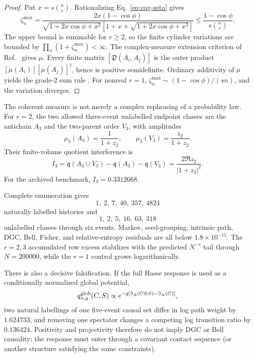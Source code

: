 \begin{proof}
Put \(x=s\binom nr\).  Rationalizing Eq.~\eqref{eq:cqg-zeta} gives
\[
 \zeta_n^{\max}
 =\frac{2x(1-\cos\phi)}
 {\sqrt{1+2x\cos\phi+x^2}
 [1+x+\sqrt{1+2x\cos\phi+x^2}]}
 \leq\frac{1-\cos\phi}{s\binom nr}.
 \]
The upper bound is summable for \(r\geq2\), so the finite cylinder
variations are bounded by
\(\prod_n(1+\zeta_n^{\max})<\infty\).  The complex-measure extension
criterion of Ref.~\cite{SuryaZalel2020} gives \(\mu\).  Every finite matrix
\([\mathfrak D(A_i,A_j)]\) is the outer product
\([\mu(A_i)][\mu(A_j)]^\dagger\), hence is positive semidefinite.  Ordinary
additivity of \(\mu\) yields the grade-2 sum rule
\cite{Sorkin1994QuantumMeasure}.  For nonreal \(r=1\),
\(\zeta_n^{\max}\sim(1-\cos\phi)/(sn)\), and the variation diverges.
\end{proof}

The coherent measure is not merely a complex rephrasing of a probability
law.  For \(r=2\), the two allowed three-event unlabelled endpoint classes
are the antichain \(A_3\) and the two-parent order \(V_3\), with amplitudes
\[
 \mu_3(A_3)=\frac1{1+z_2},\qquad
 \mu_3(V_3)=\frac{z_2}{1+z_2}.
 \]
Their finite-volume quotient interference is
\begin{equation}
 I_3=
 \mathfrak q(A_3\cup V_3)-\mathfrak q(A_3)-\mathfrak q(V_3)
 =\frac{2\Re z_2}{|1+z_2|^2}.
 \label{eq:cqg-interference}
\end{equation}
For the archived benchmark, \(I_3=0.3312668\).

Complete enumeration gives
\[
 1,\ 2,\ 7,\ 40,\ 357,\ 4824
\]
naturally labelled histories and
\[
 1,\ 2,\ 5,\ 16,\ 63,\ 318
\]
unlabelled classes through six events.  Markov, seed-grouping, intrinsic
path, DGC, Bell, Fisher, and relative-entropy residuals are all below
\(1.8\times10^{-15}\).  The \(r=2,3\) accumulated row excess stabilizes
with the predicted \(N^{-r}\) tail through \(N=200000\), while the
\(r=1\) control grows logarithmically.

There is also a decisive falsification.  If the full Hasse response is used
as a conditionally normalized global potential,
\[
 q^{\rm glob}_{n,g}(C,S)\propto
 e^{-g[\mathfrak I_\Delta(C\oplus S)-\mathfrak I_\Delta(C)]},
 \]
two natural labellings of one five-event causal set differ in log path
weight by \(1.624733\), and removing one spectator changes a competing log
transition ratio by \(0.136424\).  Positivity and projectivity therefore do
not imply DGC or Bell causality; the response must enter through a
covariant contact sequence (or another structure satisfying the same
constraints).

